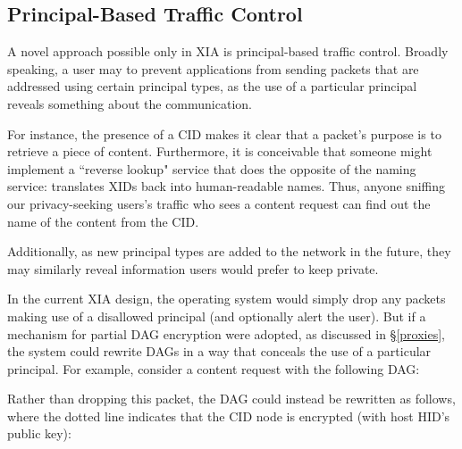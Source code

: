 \documentclass{article}
\newcommand{\entrynode}[1]{
  \SetVertexNormal[Shape      = circle,
                   FillColor  = black,
                   LineWidth  = 0pt,
                   MinSize    = 0pt]
  \Vertex[L={\tiny\,}]{#1}
  \SetVertexNormal[Shape      = circle,
                   FillColor  = white,
                   LineWidth  = 2pt]
}
\newcommand{\encryptednode}[2]{
  \SetVertexNormal[Shape      = circle,
                   FillColor  = white,
                   LineWidth  = 2pt]
  \tikzstyle{VertexStyle}=[dotted, draw, circle]
  \Vertex[#1]{#2}
  \SetVertexNormal[Shape      = circle,
                   FillColor  = white,
                   LineWidth  = 2pt]
}
\begin{document}
\subsection{Principal-Based Traffic Control}
A novel approach possible only in XIA is principal-based traffic control. Broadly speaking, a user may to prevent applications from sending packets that are addressed using certain principal types, as the use of a particular principal reveals something about the communication.

For instance, the presence of a CID makes it clear that a packet's purpose is to retrieve a piece of content. Furthermore, it is conceivable that someone might implement a ``reverse lookup" service that does the opposite of the naming service: translates XIDs back into human-readable names. Thus, anyone sniffing our privacy-seeking users's traffic who sees a content request can find out the name of the content from the CID.

Additionally, as new principal types are added to the network in the future, they may similarly reveal information users would prefer to keep private.

In the current XIA design, the operating system would simply drop any packets making use of a disallowed principal (and optionally alert the user). But if a mechanism for partial DAG encryption were adopted, as discussed in \S\ref{proxies}, the system could rewrite DAGs in a way that conceals the use of a particular principal. For example, consider a content request with the following DAG:
\begin{center}
\end{center}
Rather than dropping this packet, the DAG could instead be rewritten as follows, where the dotted line indicates that the CID node is encrypted (with host HID's public key):
\begin{center}
\end{center}
\end{document}
